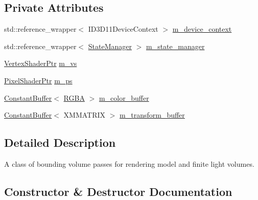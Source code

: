 \subsection*{Private Attributes}
\begin{DoxyCompactItemize}
\item 
std\+::reference\+\_\+wrapper$<$ I\+D3\+D11\+Device\+Context $>$ \mbox{\hyperlink{classmage_1_1rendering_1_1_bounding_volume_pass_add230562e9ecd5454a7a2af73cd33f3f}{m\+\_\+device\+\_\+context}}
\item 
std\+::reference\+\_\+wrapper$<$ \mbox{\hyperlink{classmage_1_1rendering_1_1_state_manager}{State\+Manager}} $>$ \mbox{\hyperlink{classmage_1_1rendering_1_1_bounding_volume_pass_a9e27e086186f11b111204323c162f9aa}{m\+\_\+state\+\_\+manager}}
\item 
\mbox{\hyperlink{namespacemage_1_1rendering_aaf704b9c54a4181f4950a1761de69dda}{Vertex\+Shader\+Ptr}} \mbox{\hyperlink{classmage_1_1rendering_1_1_bounding_volume_pass_aed191e277603f097bcd55501339fd279}{m\+\_\+vs}}
\item 
\mbox{\hyperlink{namespacemage_1_1rendering_af03d922b228ee9c8542baaa2ecc9f259}{Pixel\+Shader\+Ptr}} \mbox{\hyperlink{classmage_1_1rendering_1_1_bounding_volume_pass_a3faf9a381430a40cf6044ae91bd5d31d}{m\+\_\+ps}}
\item 
\mbox{\hyperlink{classmage_1_1rendering_1_1_constant_buffer}{Constant\+Buffer}}$<$ \mbox{\hyperlink{structmage_1_1_r_g_b_a}{R\+G\+BA}} $>$ \mbox{\hyperlink{classmage_1_1rendering_1_1_bounding_volume_pass_aac94b66aef4f01245c8526392a61cd88}{m\+\_\+color\+\_\+buffer}}
\item 
\mbox{\hyperlink{classmage_1_1rendering_1_1_constant_buffer}{Constant\+Buffer}}$<$ X\+M\+M\+A\+T\+R\+IX $>$ \mbox{\hyperlink{classmage_1_1rendering_1_1_bounding_volume_pass_a814cde2a674f4c6e4052e5af740253b3}{m\+\_\+transform\+\_\+buffer}}
\end{DoxyCompactItemize}


\subsection{Detailed Description}
A class of bounding volume passes for rendering model and finite light volumes. 

\subsection{Constructor \& Destructor Documentation}
\mbox{\label{classmage_1_1rendering_1_1_bounding_volume_pass_ac612308d7f54297f2357b0071699979d}} 
